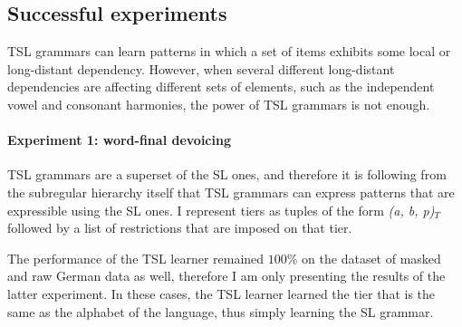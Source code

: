 \subsection{Successful experiments}

TSL grammars can learn patterns in which a set of items exhibits some local or long-distant dependency.
However, when several different long-distant dependencies are affecting different sets of elements, such as the independent vowel and consonant harmonies, the power of TSL grammars is not enough.


\paragraph{Experiment 1: word-final devoicing}

TSL grammars are a superset of the SL ones, and therefore it is following from the subregular hierarchy itself that TSL grammars can express patterns that are expressible using the SL ones.
I represent tiers as tuples of the form \emph{(a, b, p)$_T$} followed by a list of restrictions that are imposed on that tier.

\begin{table}[h!]
\centering
{}
\caption{TSL learning of the word-final devoicing; abstract representation.}
\end{table}

The performance of the TSL learner remained $100$\% on the dataset of masked and raw German data as well, therefore I am only presenting the results of the latter experiment.
In these cases, the TSL learner learned the tier that is the same as the alphabet of the language, thus simply learning the SL grammar.

